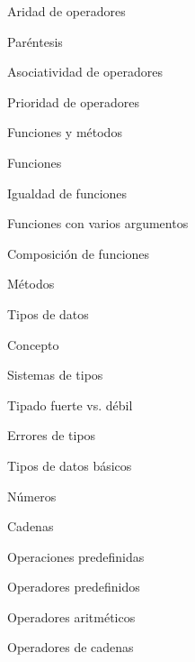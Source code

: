\begin{longenum}
\begin{longenum}
\begin{longenum}
            \begin{longenum}
                \item Aridad de operadores
                \item Paréntesis
                \item Asociatividad de operadores
                \item Prioridad de operadores
            \end{longenum}
            \item Funciones y métodos
            \begin{longenum}
                \item Funciones
                \item Igualdad de funciones
                \item Funciones con varios argumentos
                \item Composición de funciones
                \item Métodos
            \end{longenum}
            \item Tipos de datos
            \begin{longenum}
                \item Concepto
                \begin{longenum}
                    \item Sistemas de tipos
                    \item Tipado fuerte vs. débil
                    \item Errores de tipos
                \end{longenum}
                \item Tipos de datos básicos
                \begin{longenum}
                    \item Números
                    \item Cadenas
                \end{longenum}
            \end{longenum}
            \item Operaciones predefinidas
            \begin{longenum}
                \item Operadores predefinidos
                \begin{longenum}
                    \item Operadores aritméticos
                    \item Operadores de cadenas

\end{longenum}
\end{longenum}
\end{longenum}
\end{longenum}
\end{longenum}
